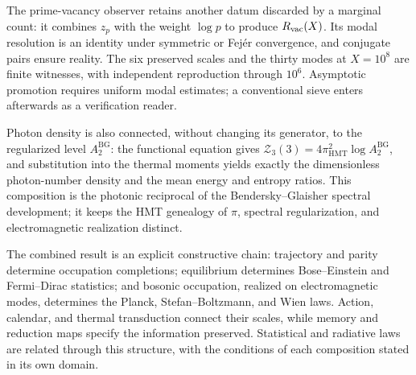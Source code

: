 The prime-vacancy observer retains another datum discarded by a marginal
count: it combines \(z_p\) with the weight \(\log p\) to produce
\(R_{\rm vac}(X)\). Its modal resolution is an identity under symmetric
or Fejér convergence, and conjugate pairs ensure reality. The six preserved
scales and the thirty modes at \(X=10^8\) are finite witnesses, with
independent reproduction through \(10^6\). Asymptotic promotion requires
uniform modal estimates; a conventional sieve enters afterwards as a
verification reader.

Photon density is also connected, without changing its generator, to the
regularized level \(A_2^{\mathrm{BG}}\): the functional equation gives
\(\mathcal Z_3(3)=4\pi_{\mathrm{HMT}}^2\log A_2^{\mathrm{BG}}\), and
substitution into the thermal moments yields exactly the dimensionless
photon-number density and the mean energy and entropy ratios. This composition is the photonic reciprocal
of the Bendersky--Glaisher spectral development; it keeps the
HMT genealogy of \(\pi\), spectral regularization, and electromagnetic
realization distinct.


The combined result is an explicit constructive chain:
trajectory and parity determine occupation completions;
equilibrium determines Bose--Einstein and Fermi--Dirac statistics;
and bosonic occupation, realized on electromagnetic modes,
determines the Planck, Stefan--Boltzmann, and Wien laws.
Action, calendar, and thermal transduction connect their scales,
while memory and reduction maps specify the information preserved.
Statistical and radiative laws are related through this structure,
with the conditions of each composition stated in its own domain.

\par\endgroup
